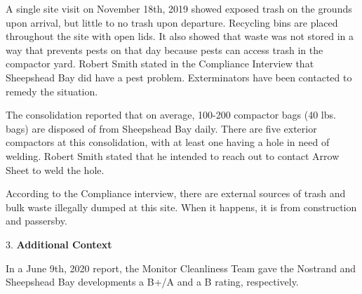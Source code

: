 A single site visit on November 18th, 2019 showed exposed trash on the grounds upon arrival, but little to no trash upon departure. Recycling bins are placed throughout the site with open lids. It also showed that waste was not stored in a way that prevents pests on that day because pests can access trash in the compactor yard. Robert Smith stated in the Compliance Interview that Sheepshead Bay did have a pest problem. Exterminators have been contacted to remedy the situation.

The consolidation reported that on average, 100-200 compactor bags (40 lbs. bags) are disposed of from Sheepshead Bay daily. There are five exterior compactors at this consolidation, with at least one having a hole in need of welding. Robert Smith stated that he intended to reach out to contact Arrow Sheet to weld the hole.

According to the Compliance interview, there are external sources of trash and bulk waste illegally dumped at this site. When it happens, it is from construction and passersby. 

3. \textbf{Additional Context} 

In a June 9th, 2020 report, the Monitor Cleanliness Team gave the Nostrand and Sheepshead Bay developments a B+/A and a B rating, respectively. 